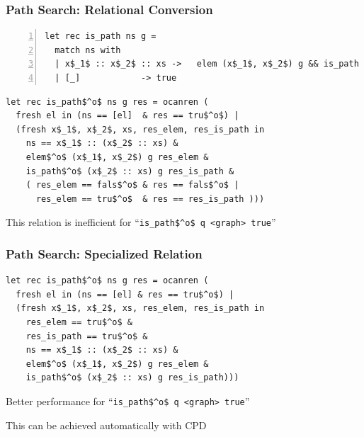 \documentclass[xcolor=table]{beamer}
\begin{document}
\begin{frame}[fragile]
  \transwipe[direction=90]
  \frametitle{Path Search: Relational Conversion }

\begin{lstlisting}[numbers=left,numberstyle=\small]
let rec is_path ns g =
  match ns with
  | x$_1$ :: x$_2$ :: xs ->   elem (x$_1$, x$_2$) g && is_path (x$_2$ :: xs) g
  | [_]            -> true
\end{lstlisting}

\pause

\begin{lstlisting}[]
let rec is_path$^o$ ns g res = ocanren (
  fresh el in (ns == [el]  & res == tru$^o$) |
  (fresh x$_1$, x$_2$, xs, res_elem, res_is_path in
    ns == x$_1$ :: (x$_2$ :: xs) &
    elem$^o$ (x$_1$, x$_2$) g res_elem &
    is_path$^o$ (x$_2$ :: xs) g res_is_path &
    ( res_elem == fals$^o$ & res == fals$^o$ |
      res_elem == tru$^o$  & res == res_is_path )))
\end{lstlisting}

This relation is inefficient for ``\lstinline{is_path$^o$ q <graph> true}''

\end{frame}

\begin{frame}[fragile]
  \transwipe[direction=90]
  \frametitle{Path Search: Specialized Relation}

\begin{lstlisting}[]
let rec is_path$^o$ ns g res = ocanren (
  fresh el in (ns == [el] & res == tru$^o$) |
  (fresh x$_1$, x$_2$, xs, res_elem, res_is_path in
    res_elem == tru$^o$ &
    res_is_path == tru$^o$ &
    ns == x$_1$ :: (x$_2$ :: xs) &
    elem$^o$ (x$_1$, x$_2$) g res_elem &
    is_path$^o$ (x$_2$ :: xs) g res_is_path)))
\end{lstlisting}

\vspace{16pt}

Better performance for ``\lstinline{is_path$^o$ q <graph> true}''

\pause
\vspace{10pt}

This can be achieved automatically with CPD


\end{frame}
\end{document}
